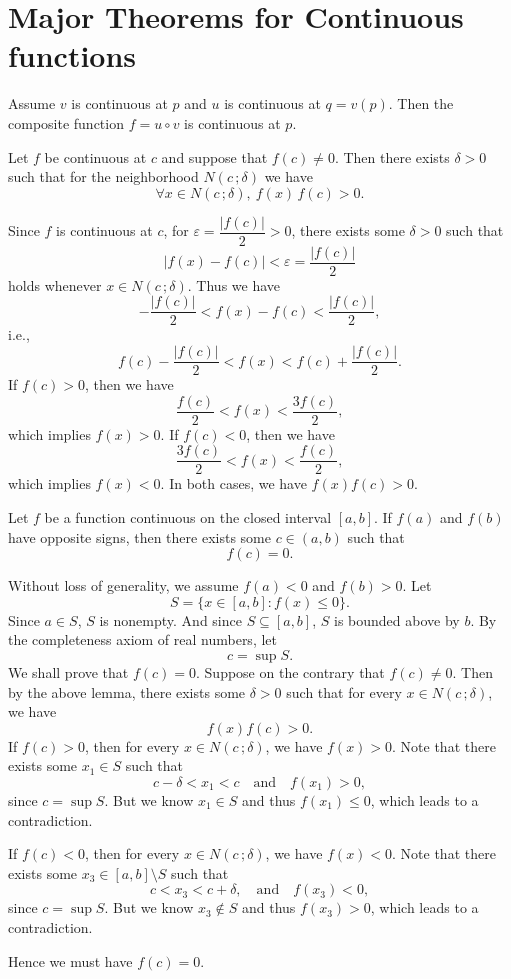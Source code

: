 	\section{Major Theorems for Continuous functions}
	\begin{theoremenv}
		Assume $v$ is continuous at $p$ and $u$ is continuous at $q=v(p)$. Then the composite function $f=u\circ v$ is continuous at $p$.
	\end{theoremenv}
	\begin{lemmaenv}
		Let $f$ be continuous at $c$ and suppose that $f(c)\neq 0$.
		Then there exists $\delta>0$ such that for the neighborhood $N(c\,;\delta)$ we have
		\[
		\forall x\in N(c\,;\delta),\ f(x)\,f(c)>0 .
		\]
	\end{lemmaenv}
	\begin{proofenv}
		Since $f$ is continuous at $c$, for $\varepsilon = \dfrac{|f(c)|}{2}>0$, there exists some $\delta>0$ such that
		\[
		|f(x)-f(c)|<\varepsilon = \frac{|f(c)|}{2}
		\]
		holds whenever $x\in N(c\,;\delta)$. Thus we have
		\[
		-\frac{|f(c)|}{2} < f(x)-f(c) < \frac{|f(c)|}{2},
		\]
		i.e.,
		\[
		f(c)-\frac{|f(c)|}{2} < f(x) < f(c)+\frac{|f(c)|}{2}.
		\]
		If $f(c)>0$, then we have
		\[
		\frac{f(c)}{2} < f(x) < \frac{3f(c)}{2},
		\]
		which implies $f(x)>0$. If $f(c)<0$, then we have
		\[
		\frac{3f(c)}{2} < f(x) < \frac{f(c)}{2},
		\]
		which implies $f(x)<0$. In both cases, we have $f(x)f(c)>0$.
	\end{proofenv}
	\begin{theoremenv}
		Let $f$ be a function continuous on the closed interval $[a,b]$. If $f(a)$ and $f(b)$ have opposite signs, then there exists some $c\in (a,b)$ such that
		\[
		f(c)=0.
		\]
	\end{theoremenv}
	\begin{proofenv}
		Without loss of generality, we assume $f(a)<0$ and $f(b)>0$. Let
		\[
		S=\{ x\in [a,b] : f(x)\le 0 \}.
		\]
		Since $a\in S$, $S$ is nonempty. And since $S\subseteq [a,b]$, $S$ is bounded above by $b$. By the completeness axiom of real numbers, let
		\[
		c=\sup S.
		\]
		We shall prove that $f(c)=0$. Suppose on the contrary that $f(c)\neq 0$. Then by the above lemma, there exists some $\delta>0$ such that for every $x\in N(c\,;\delta)$, we have
		\[
		f(x)f(c)>0.
		\]
		If $f(c)>0$, then for every $x\in N(c\,;\delta)$, we have $f(x)>0$. Note that there exists some $x_1\in S$ such that
		\[
		c-\delta < x_1 < c\quad \text{and} \quad f(x_1) > 0,
		\]
		since $c=\sup S$. But we know $x_1\in S$ and thus $f(x_1) \le 0$, which leads to a contradiction.
		
		If $f(c)<0$, then for every $x\in N(c\,;\delta)$, we have $f(x)<0$. Note that there exists some $x_3\in [a,b]\setminus S$ such that
		\[
		c < x_3 < c+\delta, \quad \text{and} \quad f(x_3) < 0,
		\]
		since $c=\sup S$. But we know $x_3\notin S$ and thus $f(x_3) > 0$, which leads to a contradiction.

		Hence we must have $f(c)=0$.
	\end{proofenv}
